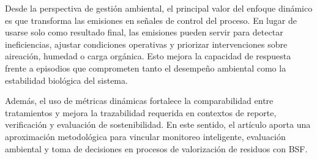 Desde la perspectiva de gestión ambiental, el principal valor del enfoque dinámico es que transforma las emisiones en señales de control del proceso. En lugar de usarse solo como resultado final, las emisiones pueden servir para detectar ineficiencias, ajustar condiciones operativas y priorizar intervenciones sobre aireación, humedad o carga orgánica. Esto mejora la capacidad de respuesta frente a episodios que comprometen tanto el desempeño ambiental como la estabilidad biológica del sistema.

Además, el uso de métricas dinámicas fortalece la comparabilidad entre tratamientos y mejora la trazabilidad requerida en contextos de reporte, verificación y evaluación de sostenibilidad. En este sentido, el artículo aporta una aproximación metodológica para vincular monitoreo inteligente, evaluación ambiental y toma de decisiones en procesos de valorización de residuos con BSF.
